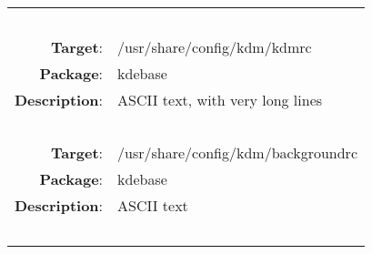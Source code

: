 \begin{longtable}{rl}
\hline
\multicolumn{2}{l}{\ }\\
\textbf{Target}: & /usr/share/config/kdm/kdmrc\\
\textbf{Package}: & kdebase\\
\textbf{Description}: & ASCII text, with very long lines\\
\multicolumn{2}{l}{\ }\\
\textbf{Target}: & /usr/share/config/kdm/backgroundrc\\
\textbf{Package}: & kdebase\\
\textbf{Description}: & ASCII text\\
\multicolumn{2}{l}{\ }\\
\hline
\end{longtable}
